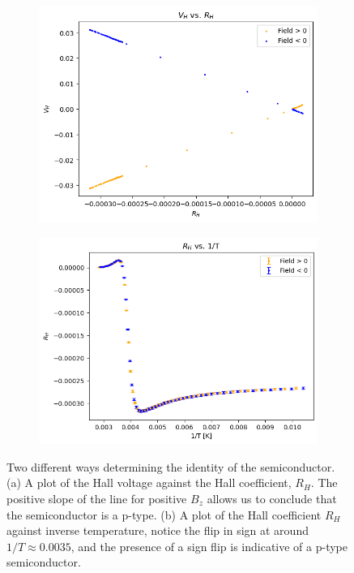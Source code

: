 \documentclass[10pt]{article}
\begin{document}
	\begin{figure}
		\centering
		\begin{subfigure}{0.45\textwidth}
			\includegraphics[width=\textwidth]{images/v-vs-rh.png}
			\caption{}
			\label{v-vs-rh}
		\end{subfigure}
		\begin{subfigure}{0.47\textwidth}
			\includegraphics[width=\textwidth]{images/30uA-rh-plot2.png}
			\caption{}
			\label{30uA-rh}
		\end{subfigure}
		\caption{Two different ways determining the identity of the semiconductor. (a) A plot of the Hall
			voltage against the Hall coefficient, \( R_H \). The positive slope of the line for positive \(
			B_z \) allows us to conclude that the semiconductor is a p-type. (b) A plot of the Hall
			coefficient \( R_H \) against inverse temperature, notice the flip in sign at around \( 1 / T
		\approx 0.0035\), and the presence of a sign flip is indicative of a p-type semiconductor.}    
	\end{figure}
\end{document}
